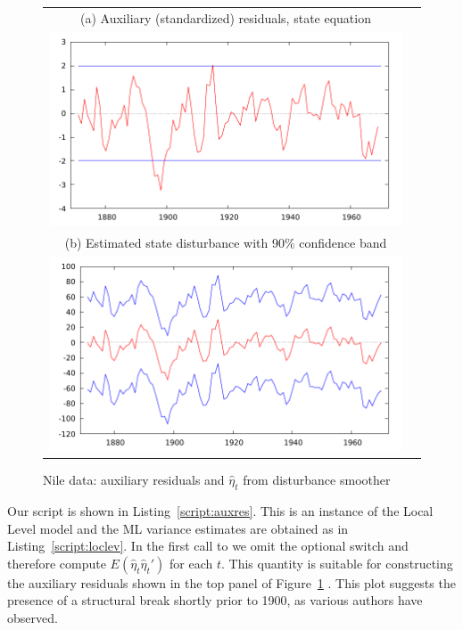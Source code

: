 \begin{figure}[htbp]
  \centering
  \begin{tabular}{cc}
  \small
  (a) Auxiliary (standardized) residuals, state equation \\
    \includegraphics{figures/nile_eta_ksd} \\[14pt]
  \small (b) Estimated state disturbance with 90\% confidence band \\
  \includegraphics{figures/nile_eta_dk}
  \end{tabular}
  \caption{Nile data: auxiliary residuals and $\hat{\eta}_t$
    from disturbance smoother}
  \label{fig:nile}
\end{figure}

Our script is shown in Listing~\ref{script:auxres}. This is an
instance of the Local Level model and the ML variance estimates are
obtained as in Listing~\ref{script:loclev}. In the first call to
 we omit the optional switch and therefore compute
$E(\hat{\eta}_t\hat{\eta}_t')$ for each $t$. This quantity is suitable
for constructing the auxiliary residuals shown in the top panel of
Figure~\ref{fig:nile} \citep[for similar plots
see][]{koopman-etal99,pelagatti11}.  This plot suggests the presence
of a structural break shortly prior to 1900, as various authors have
observed.

